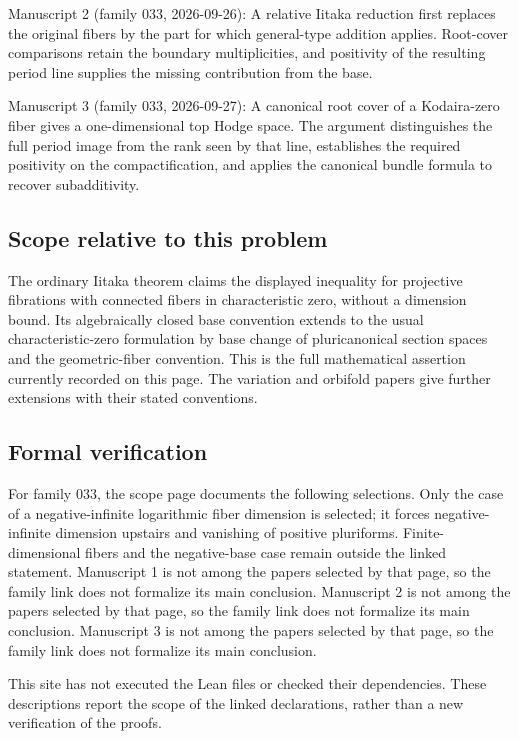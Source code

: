 \documentclass[11pt]{article}
\begin{document}
Manuscript 2 (family 033, 2026-09-26): A relative Iitaka reduction first replaces the original fibers by the part for which general-type addition applies. Root-cover comparisons retain the boundary multiplicities, and positivity of the resulting period line supplies the missing contribution from the base.

Manuscript 3 (family 033, 2026-09-27): A canonical root cover of a Kodaira-zero fiber gives a one-dimensional top Hodge space. The argument distinguishes the full period image from the rank seen by that line, establishes the required positivity on the compactification, and applies the canonical bundle formula to recover subadditivity.

\subsection{Scope relative to this problem}
The ordinary Iitaka theorem claims the displayed inequality for projective fibrations with connected fibers in characteristic zero, without a dimension bound. Its algebraically closed base convention extends to the usual characteristic-zero formulation by base change of pluricanonical section spaces and the geometric-fiber convention. This is the full mathematical assertion currently recorded on this page. The variation and orbifold papers give further extensions with their stated conventions.

\subsection{Formal verification}
For family 033, the scope page documents the following selections. Only the case of a negative-infinite logarithmic fiber dimension is selected; it forces negative-infinite dimension upstairs and vanishing of positive pluriforms. Finite-dimensional fibers and the negative-base case remain outside the linked statement. Manuscript 1 is not among the papers selected by that page, so the family link does not formalize its main conclusion. Manuscript 2 is not among the papers selected by that page, so the family link does not formalize its main conclusion. Manuscript 3 is not among the papers selected by that page, so the family link does not formalize its main conclusion.

This site has not executed the Lean files or checked their dependencies. These descriptions report the scope of the linked declarations, rather than a new verification of the proofs.
\end{document}
